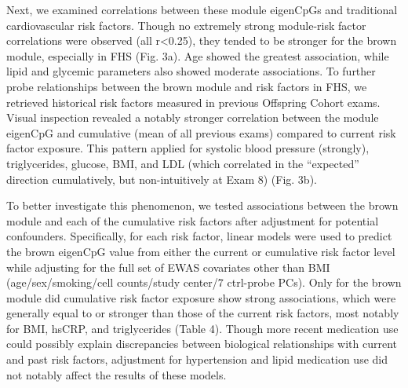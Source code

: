 \documentclass[]{bmcart}
\theoremstyle{definition}
\theoremstyle{definition}
\theoremstyle{definition}
\theoremstyle{remark}
\begin{document}
Next, we examined correlations between these module eigenCpGs and
traditional cardiovascular risk factors. Though no extremely strong
module-risk factor correlations were observed (all
\textbar{}r\textbar{}\textless{}0.25), they tended to be stronger for
the brown module, especially in FHS (Fig. 3a). Age showed the greatest
association, while lipid and glycemic parameters also showed moderate
associations. To further probe relationships between the brown module
and risk factors in FHS, we retrieved historical risk factors measured
in previous Offspring Cohort exams. Visual inspection revealed a notably
stronger correlation between the module eigenCpG and cumulative (mean of
all previous exams) compared to current risk factor exposure. This
pattern applied for systolic blood pressure (strongly), triglycerides,
glucose, BMI, and LDL (which correlated in the ``expected'' direction
cumulatively, but non-intuitively at Exam 8) (Fig. 3b).

To better investigate this phenomenon, we tested associations between
the brown module and each of the cumulative risk factors after
adjustment for potential confounders. Specifically, for each risk
factor, linear models were used to predict the brown eigenCpG value
from either the current or cumulative risk factor level while adjusting
for the full set of EWAS covariates other than BMI (age/sex/smoking/cell
counts/study center/7 ctrl-probe PCs). Only for the brown module did
cumulative risk factor exposure show strong associations, which were
generally equal to or stronger than those of the current risk factors,
most notably for BMI, hsCRP, and triglycerides (Table 4). Though more
recent medication use could possibly explain discrepancies between
biological relationships with current and past risk factors, adjustment
for hypertension and lipid medication use did not notably affect the
results of these models.
\end{document}
